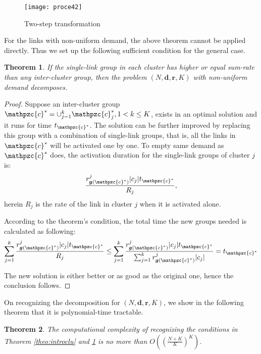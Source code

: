 \documentclass[10pt,onecolumn,journal,draftcls,oneside]{IEEEtran}
\newtheorem{theorem}{Theorem}
\newcounter{cond}
\newcommand{\Cc}{\mathpzc{c}}
\newcommand{\Bd}{\boldsymbol{d}}
\newcommand{\Br}{\boldsymbol{r}}
\newcommand{\Bg}{\boldsymbol{g}}
\begin{document}
\begin{figure} [ht!]	
\centering
{\texttt{[image: proce42]}}
\vspace{-2mm}
\caption{Two-step transformation}
\label{fig:proc}
\end{figure}

For the links with non-uniform demand, the above theorem cannot be applied directly. Thus we set up the following sufficient condition for the general case.

\begin{theorem}
\label{theo:introclun}
If the single-link group in each cluster has higher or equal sum-rate than any inter-cluster group, then the problem $(N, \Bd, \Br, K)$ with non-uniform demand decomposes.
\end{theorem}  

\begin{proof}
Suppose an inter-cluster group $\Cc^* = \cup_{j=1}^k \Cc^*_j, 1 < k \leq K$, exists in an optimal solution and it runs for time $t_{\Cc^*}$. The solution can be further improved by replacing this group with a combination of single-link groups, that is, all the links in $\Cc^*$ will be activated one by one. To empty same demand as $\Cc^*$ does, the activation duration for the single-link groups of cluster $j$ is:
\begin{equation}
\frac {r^j_{\Bg(\Cc^*)}|c_j|t_{\Cc^*}} {R_j}, 
\end{equation}
herein $R_j$ is the rate of the link in cluster $j$ when it is activated alone.

According to the theorem's condition, the total time the new groups needed is calculated as following:
\begin{equation}
\sum_{j=1}^k \frac {r^j_{\Bg(\Cc^*)}|c_j|t_{\Cc^*}} {R_j} \leq \sum_{j=1}^k \frac {r^j_{\Bg(\Cc^*)}|c_j|t_{\Cc^*}} {\sum_{j=1}^k r^j_{\Bg(\Cc^*)}|c_j|} = t_{\Cc^*}
\end{equation}

The new solution is either better or as good as the original one, hence the conclusion follows.
\end{proof}

On recognizing the decomposition for $(N, \Bd, \Br, K)$, we show in the following theorem that it is polynomial-time tractable.

\begin{theorem}
\label{theo:ccc}
The computational complexity of recognizing the conditions in Theorem \ref{theo:introclu} and \ref {theo:introclun} is no more than $O((\frac{N+K}{K})^K)$.
\end{theorem}  
\end{document}
